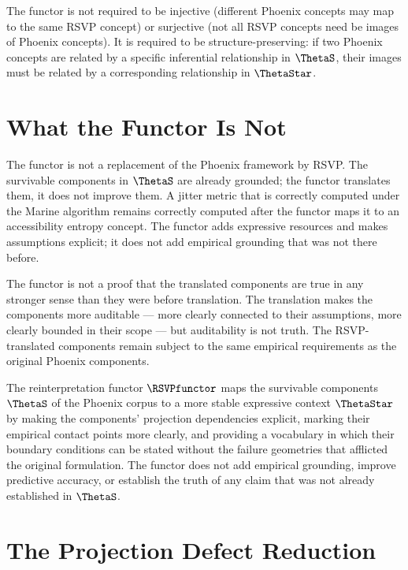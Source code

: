 The functor is not required to be injective (different
Phoenix concepts may map to the same RSVP concept) or
surjective (not all RSVP concepts need be images of
Phoenix concepts). It is required to be structure-preserving:
if two Phoenix concepts are related by a specific inferential
relationship in $\ThetaS$, their images must be related
by a corresponding relationship in $\ThetaStar$.

\section{What the Functor Is Not}
\label{sec:functor-not}

The functor is not a replacement of the Phoenix framework
by RSVP. The survivable components in $\ThetaS$ are
already grounded; the functor translates them, it does
not improve them. A jitter metric that is correctly
computed under the Marine algorithm remains correctly
computed after the functor maps it to an accessibility
entropy concept. The functor adds expressive resources
and makes assumptions explicit; it does not add empirical
grounding that was not there before.

The functor is not a proof that the translated components
are true in any stronger sense than they were before
translation. The translation makes the components more
auditable --- more clearly connected to their assumptions,
more clearly bounded in their scope --- but auditability
is not truth. The RSVP-translated components remain
subject to the same empirical requirements as the original
Phoenix components.

\begin{auditprop}
\label{ap:functor-scope}
The reinterpretation functor $\RSVPfunctor$ maps the
survivable components $\ThetaS$ of the Phoenix corpus
to a more stable expressive context $\ThetaStar$ by
making the components' projection dependencies explicit,
marking their empirical contact points more clearly,
and providing a vocabulary in which their boundary
conditions can be stated without the failure geometries
that afflicted the original formulation. The functor
does not add empirical grounding, improve predictive
accuracy, or establish the truth of any claim that was
not already established in $\ThetaS$.
\end{auditprop}

\section{The Projection Defect Reduction}
\label{sec:projection-defect-reduction}

